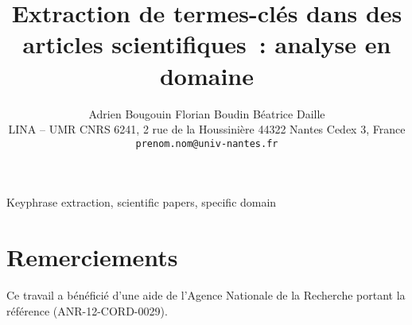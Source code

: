 \documentclass[10pt,a4paper,twoside]{article}
\title{Extraction de termes-clés dans des articles scientifiques~: analyse en domaine}
\author{Adrien Bougouin \quad Florian Boudin \quad Béatrice Daille\\
        {\small{LINA -- UMR CNRS 6241, 2 rue de la Houssinière 44322 Nantes Cedex 3, France\\ 
         \texttt{prenom.nom@univ-nantes.fr}}}}
\begin{document}
\maketitle


          {Keyphrase extraction, scientific papers, specific domain}

\newpage








\section*{Remerciements}
  Ce travail a bénéficié d'une aide de l'Agence Nationale de la Recherche
  portant la référence (ANR-12-CORD-0029).





\end{document}
